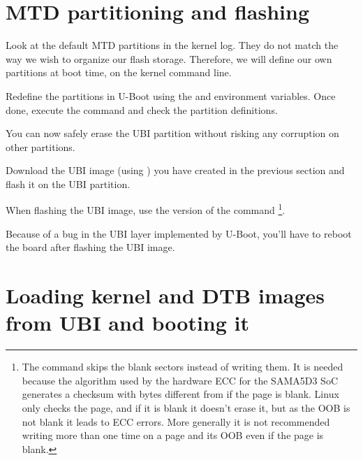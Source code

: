 %
%
%
%
%
%

%
%
%

\section{MTD partitioning and flashing}

Look at the default MTD partitions in the kernel log. They do not
match the way we wish to organize our flash
storage. Therefore, we will define our own partitions at boot time,
on the kernel command line.

Redefine the partitions in U-Boot using the  and
 environment variables.
Once done, execute the  command and check the partition
definitions.

You can now safely erase the UBI partition without risking any
corruption on other partitions.

Download the UBI image (using ) you have created in the
previous section and flash it on the UBI partition.

When flashing the UBI image, use the  version of the
command \footnote{The command  skips
  the blank sectors instead of writing them. It is needed because the
  algorithm used by the hardware ECC for the SAMA5D3 SoC generates a
  checksum with bytes different from  if the page is blank. Linux
  only checks the page, and if it is blank it doesn't erase it, but as
  the OOB is not blank it leads to ECC errors. More generally it is
  not recommended writing more than one time on a page and its OOB
  even if the page is blank.}.

Because of a bug in the UBI layer implemented by U-Boot, you'll have
to reboot the board after flashing the UBI image.

\section{Loading kernel and DTB images from UBI and booting it}

